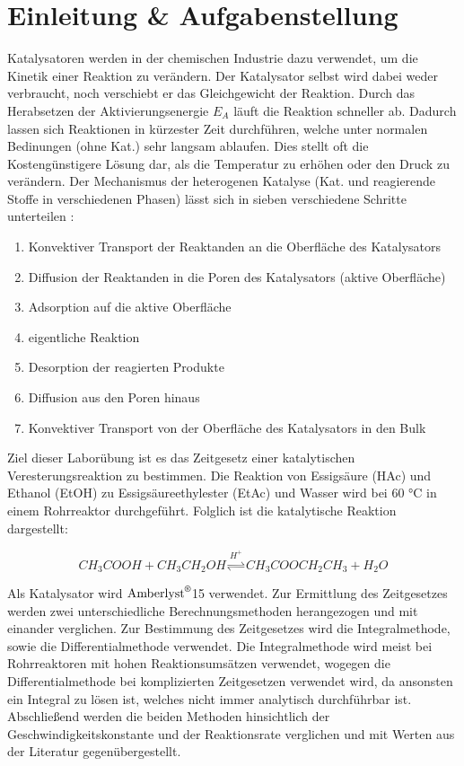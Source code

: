 \documentclass[12pt,liststotoc]{report}
\begin{document}
\tableofcontents
\newpage
{}
\chapter{Einleitung \& Aufgabenstellung}

Katalysatoren werden in der chemischen Industrie dazu verwendet, um die Kinetik einer Reaktion zu verändern. Der Katalysator selbst wird dabei weder verbraucht, noch verschiebt er das Gleichgewicht der Reaktion. Durch das Herabsetzen der Aktivierungsenergie $E_A$ läuft die Reaktion schneller ab. Dadurch lassen sich Reaktionen in kürzester Zeit durchführen, welche unter normalen Bedinungen (ohne Kat.) sehr langsam ablaufen. Dies stellt oft die Kostengünstigere Lösung dar, als die Temperatur zu erhöhen oder den Druck zu verändern. Der Mechanismus der heterogenen Katalyse (Kat. und reagierende Stoffe in verschiedenen Phasen) lässt sich in sieben verschiedene Schritte unterteilen \cite{Skript_2018}:

\begin{enumerate}
    \item Konvektiver Transport der Reaktanden an die Oberfläche des Katalysators
    \item Diffusion der Reaktanden in die Poren des Katalysators (aktive Oberfläche)
    \item Adsorption auf die aktive Oberfläche
    \item eigentliche Reaktion
    \item Desorption der reagierten Produkte
    \item Diffusion aus den Poren hinaus
    \item Konvektiver Transport von der Oberfläche des Katalysators in den Bulk
\end{enumerate}

Ziel dieser Laborübung ist es das Zeitgesetz einer katalytischen Veresterungsreaktion zu bestimmen. Die Reaktion von Essigsäure (HAc) und Ethanol (EtOH) zu Essigsäureethylester (EtAc) und Wasser wird bei 60 °C in einem Rohrreaktor durchgeführt. Folglich ist die katalytische Reaktion dargestellt:

\begin{equation}
CH_3COOH + CH_3CH_2OH \stackrel{H^+}{\rightleftharpoons} CH_3COOCH_2CH_3 + H_2O
\end{equation}

Als Katalysator wird $\text{Amberlyst}^\text{\textregistered}$15 verwendet. Zur Ermittlung des Zeitgesetzes werden zwei unterschiedliche Berechnungsmethoden herangezogen und mit einander verglichen. Zur Bestimmung des Zeitgesetzes wird die Integralmethode, sowie die Differentialmethode verwendet. Die Integralmethode wird meist bei Rohrreaktoren mit hohen Reaktionsumsätzen verwendet, wogegen die Differentialmethode bei komplizierten Zeitgesetzen verwendet wird, da ansonsten ein Integral zu lösen ist, welches nicht immer analytisch durchführbar ist. Abschließend werden die beiden Methoden hinsichtlich der Geschwindigkeitskonstante und der Reaktionsrate verglichen und mit Werten aus der Literatur gegenübergestellt.
\end{document}
